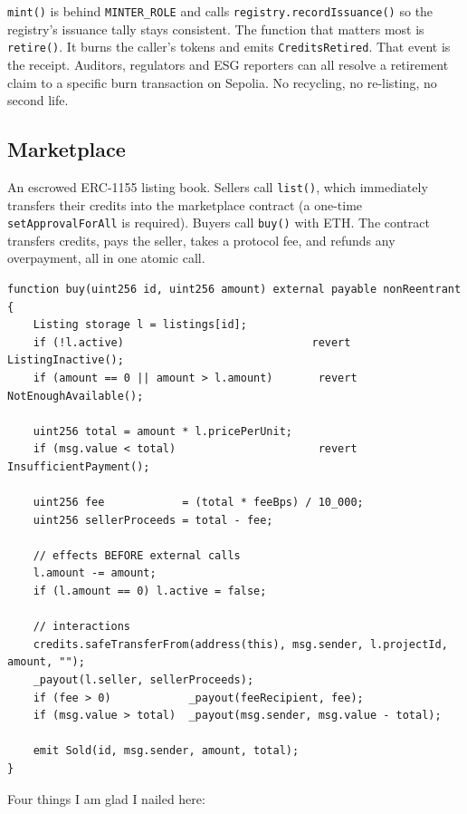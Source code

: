 \documentclass[11pt,a4paper]{article}
\begin{document}
\texttt{mint()} is behind \texttt{MINTER\_ROLE} and calls
\texttt{registry.recordIssuance()} so the registry's issuance tally
stays consistent. The function that matters most is \texttt{retire()}.
It burns the caller's tokens and emits \texttt{CreditsRetired}. That
event is the receipt. Auditors, regulators and ESG reporters can all
resolve a retirement claim to a specific burn transaction on Sepolia.
No recycling, no re-listing, no second life.

\subsection{Marketplace}
An escrowed ERC-1155 listing book. Sellers call \texttt{list()}, which
immediately transfers their credits into the marketplace contract (a
one-time \texttt{setApprovalForAll} is required). Buyers call
\texttt{buy()} with ETH. The contract transfers credits, pays the
seller, takes a protocol fee, and refunds any overpayment, all in one
atomic call.

\begin{lstlisting}[language={},caption={Buy flow (simplified), showing checks-effects-interactions ordering.}]
function buy(uint256 id, uint256 amount) external payable nonReentrant {
    Listing storage l = listings[id];
    if (!l.active)                             revert ListingInactive();
    if (amount == 0 || amount > l.amount)       revert NotEnoughAvailable();

    uint256 total = amount * l.pricePerUnit;
    if (msg.value < total)                      revert InsufficientPayment();

    uint256 fee            = (total * feeBps) / 10_000;
    uint256 sellerProceeds = total - fee;

    // effects BEFORE external calls
    l.amount -= amount;
    if (l.amount == 0) l.active = false;

    // interactions
    credits.safeTransferFrom(address(this), msg.sender, l.projectId, amount, "");
    _payout(l.seller, sellerProceeds);
    if (fee > 0)            _payout(feeRecipient, fee);
    if (msg.value > total)  _payout(msg.sender, msg.value - total);

    emit Sold(id, msg.sender, amount, total);
}
\end{lstlisting}

Four things I am glad I nailed here:
\end{document}
